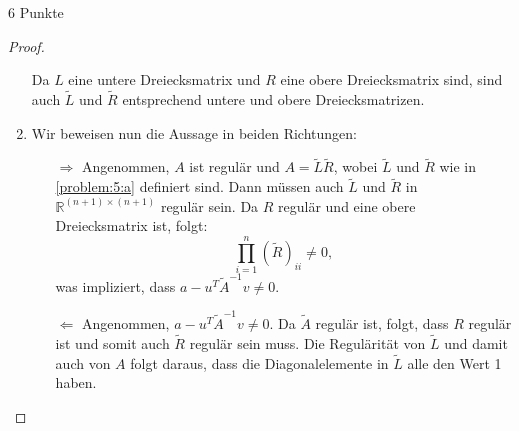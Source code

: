\documentclass{problemset}
\begin{document}
\begin{problem}{6 Punkte}
\begin{proof}
\begin{enumerate}
              Da \( L \) eine untere Dreiecksmatrix und \( R \) eine obere
              Dreiecksmatrix sind, sind auch \( \tilde{L} \) und \( \tilde{R}
              \) entsprechend untere und obere Dreiecksmatrizen.

        \item Wir beweisen nun die Aussage in beiden Richtungen:
              \begin{itemize}
                  \item[\(\Rightarrow\)]
                        Angenommen, \( A \) ist regulär und \( A = \tilde{L}
                        \tilde{R} \), wobei \( \tilde{L} \) und \( \tilde{R} \)
                        wie in \ref{problem:5:a} definiert sind. Dann müssen
                        auch \( \tilde{L} \) und \( \tilde{R} \) in \(
                        \mathbb{R}^{(n+1) \times (n+1)} \) regulär sein. Da \(
                        R \) regulär und eine obere Dreiecksmatrix ist, folgt:
                        \begin{equation*}
                            \prod_{i=1}^n (\tilde{R})_{ii} \neq 0,
                        \end{equation*}
                        was impliziert, dass \( a - u^T \tilde{A}^{-1} v \neq 0 \).

                  \item[\(\Leftarrow\)]
                        Angenommen, \( a - u^T \tilde{A}^{-1} v \neq 0 \). Da
                        \( \tilde{A} \) regulär ist, folgt, dass \( R \)
                        regulär ist und somit auch \( \tilde{R} \) regulär sein
                        muss. Die Regulärität von \( \tilde{L} \) und damit auch von \(
                        A \) folgt daraus, dass die Diagonalelemente in \(
                        \tilde{L} \)
                        alle den Wert 1 haben.
              \end{itemize}
    \end{enumerate}
\end{proof}
\end{problem}
\end{document}
